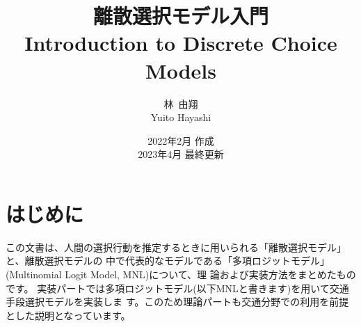 \documentclass[a4paper,11pt,oneside,uplatex]{jsbook}
\title{{\huge 離散選択モデル入門}\\{\large Introduction to Discrete Choice Models} \\ 
$\,$\\$\,$\\$\,$\\$\,$\\$\,$\\$\,$\\$\,$\\}
\author{林~由翔\\Yuito Hayashi}
\date{2022年2月 作成 \\ 2023年4月 最終更新}
\theoremstyle{definition}
\begin{document}
\maketitle
\frontmatter
\chapter{はじめに}
この文書は、人間の選択行動を推定するときに用いられる「離散選択モデル」と、離散選択モデルの
中で代表的なモデルである「多項ロジットモデル」(Multinomial Logit Model, MNL)について、理
論および実装方法をまとめたものです。
実装パートでは多項ロジットモデル(以下MNLと書きます)を用いて交通手段選択モデルを実装しま
す。このため理論パートも交通分野での利用を前提とした説明となっています。

\setcounter{tocdepth}{2}
\tableofcontents

\mainmatter







\backmatter


\end{document}
